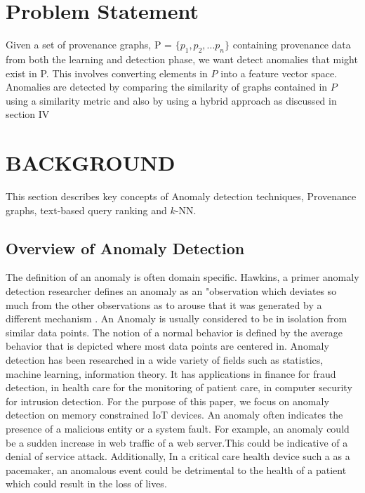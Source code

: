 \section{Problem Statement}

Given a set of provenance graphs, P = $\{p_1, p_2,...p_n\}$ containing provenance data from both the learning and detection phase, we want detect anomalies that might exist in P.  This involves converting elements in $P$ into a feature vector space. Anomalies are detected by comparing the similarity of graphs contained in $P$ using a similarity metric and also by using a hybrid approach as discussed in section IV



\section{BACKGROUND}

This section describes key concepts of Anomaly detection techniques, Provenance graphs, text-based query ranking and $k$-NN. 

\subsection{Overview of Anomaly Detection}

The definition of an anomaly is often domain specific. Hawkins, a primer anomaly detection researcher defines an anomaly as an "observation which deviates so much from the other observations as to arouse that it was generated by a different mechanism \cite{hawkins}. An Anomaly is usually considered to be in isolation from similar data points. The notion of a normal behavior is defined by the average behavior that is depicted where most data points are centered in. Anomaly detection has been researched in a wide variety of fields such as statistics, machine learning, information theory. It has applications in finance for fraud detection, in health care for the monitoring of patient care, in computer security for intrusion detection. For the purpose of this paper, we focus on anomaly detection on memory constrained IoT devices. An anomaly often indicates the presence of a malicious entity or a system fault. For example, an anomaly could be a sudden increase in web traffic of a web server.This could be indicative of a denial of service attack. Additionally, In a critical care health device such a as a pacemaker, an anomalous event could be detrimental to the health of a patient which could result in the loss of lives. 






